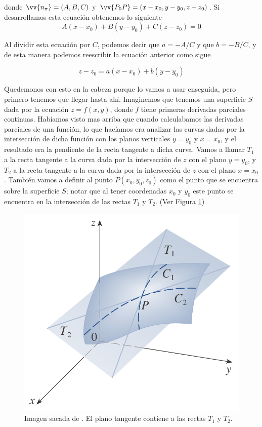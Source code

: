 \documentclass[12pt]{article}
\begin{document}
donde $ \vv{n_{\pi}} = \left(A,B,C\right) $ y $ \vv{P_{0}P} = \left(x-x_{0},y-y_{0},z-z_{0}\right) $. Si desarrollamos esta ecuación obtenemos lo siguiente
\[
A\left(x-x_{0}\right) + B\left(y-y_{0}\right) + C\left(z-z_{0}\right) = 0
\]

Al dividir esta ecuación por $ C $, podemos decir que $ a = -A/C $ y que $ b = -B/C $, y de esta manera podemos reescribir la ecuación anterior como sigue

\begin{equation}\label{eq:plano-tg}
z-z_{0} = a\left(x-x_{0}\right) + b\left(y-y_{0}\right)
\end{equation}

Quedemonos con esto en la cabeza porque lo vamos a usar enseguida, pero primero tenemos que llegar hasta ahí. Imaginemos que tenemos una superficie $ S $ dada por la ecuación $ z=f(x,y) $, donde $ f $ tiene primeras derivadas parciales continuas. Habíamos visto mas arriba que cuando calculabamos las derivadas parciales de una función, lo que hacíamos era analizar las curvas dadas por la intersección de dicha función con los planos verticales $ y=y_{0} $ y $ x=x_{0} $, y el resultado era la pendiente de la recta tangente a dicha curva. Vamos a llamar $ T_{1} $ a la recta tangente a la curva dada por la intersección de $ z $ con el plano $ y =y_{0} $, y $ T_{2} $ a la recta tangente a la curva dada por la intersección de $ z $ con el plano $ x=x_{0} $. También vamos a definir al punto $ P(x_{0}, y_{0}, z_{0}) $ como el punto que se encuentra sobre la superficie $ S $; notar que al tener coordenadas $ x_{0} $ y $ y_{0} $ este punto se encuentra en la intersección de las rectas $ T_{1} $ y $ T_{2} $. (Ver Figura \ref{fig:plano-tg})
\begin{figure}[H]
  \centering
  \includegraphics[width=0.5\linewidth]{imagenes/plano-tg.png}
  \caption{Imagen sacada de \parencite{stewart2}. El plano tangente contiene a las rectas $ T_{1} $ y $ T_{2} $.}
  \label{fig:plano-tg}
\end{figure}
\end{document}
